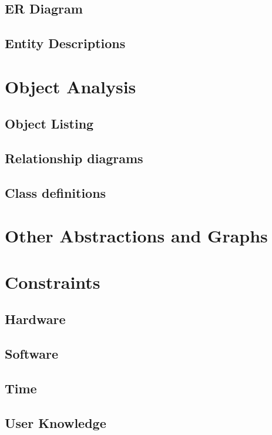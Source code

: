 \documentclass{article}
\begin{document}
	\subsection{ER Diagram}
	
	\subsection{Entity Descriptions}

	\section{Object Analysis}

	\subsection{Object Listing}

	\subsection{Relationship diagrams}

	\subsection{Class definitions}

\section{Other Abstractions and Graphs}

\section{Constraints}

	\subsection{Hardware}

	\subsection{Software}

	\subsection{Time}

	\subsection{User Knowledge}
\end{document}
